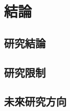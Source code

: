 \chapter{結論}\label{ch:conclusion}

\section{研究結論}\label{sec:conclusions}
\section{研究限制}\label{sec:limitations}
\section{未來研究方向}\label{sec:future}
